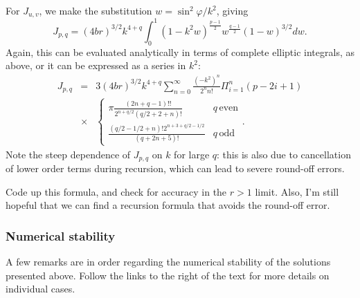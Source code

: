 \documentclass[modern]{aastex61}
\begin{document}
{For $J_{u,v}$, we make the substitution $w=\sin^2{\varphi}/k^2$, giving
\begin{equation}
J_{p,q} = (4br)^{3/2} k^{4+q} \int_0^1 (1-k^2 w)^{\frac{p-1}{2}} w^{\frac{q-1}{2}} (1-w)^{3/2} dw.
\end{equation}
Again, this can be evaluated analytically in terms of complete elliptic integrals,
as above, or it can be expressed as a series in $k^2$:
\begin{eqnarray}
J_{p,q} &=& 3(4br)^{3/2} k^{4+q}  \sum_{n=0}^\infty \frac{(-k^2)^n}{2^n n!} \Pi_{i=1}^n (p-2i+1) \\
&\times& \begin{cases} \pi \frac{(2n+q-1)!!}{2^{n+q/2}(q/2+2+n)!} & q \, \mathrm{even}\\
\frac{(q/2-1/2+n)! 2^{n+3+q/2-1/2}}{(q+2n+5)!} & q \, \mathrm{odd} \end{cases}.
\end{eqnarray}
Note the steep dependence of $J_{p,q}$ on $k$ for large $q$:  this is also due to cancellation
of lower order terms during recursion, which can lead to severe round-off errors.

{\color{red} Code up this formula, and check for accuracy in the $r > 1$ limit.  Also,
I'm still hopeful that we can find a recursion formula that avoids the round-off error.}

\subsubsection{Numerical stability}
\label{app:numericalstability}

A few remarks are in order regarding the numerical stability of the solutions
presented above. Follow the links to the right of the text for more details on
individual cases.

}
\end{document}
